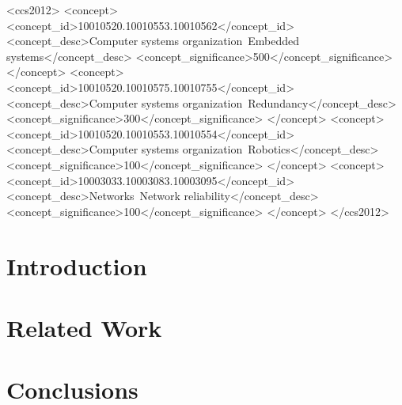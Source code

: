 \documentclass[sigconf]{acmart}
\begin{document}
%
%
\begin{CCSXML}
<ccs2012>
 <concept>
  <concept_id>10010520.10010553.10010562</concept_id>
  <concept_desc>Computer systems organization~Embedded systems</concept_desc>
  <concept_significance>500</concept_significance>
 </concept>
 <concept>
  <concept_id>10010520.10010575.10010755</concept_id>
  <concept_desc>Computer systems organization~Redundancy</concept_desc>
  <concept_significance>300</concept_significance>
 </concept>
 <concept>
  <concept_id>10010520.10010553.10010554</concept_id>
  <concept_desc>Computer systems organization~Robotics</concept_desc>
  <concept_significance>100</concept_significance>
 </concept>
 <concept>
  <concept_id>10003033.10003083.10003095</concept_id>
  <concept_desc>Networks~Network reliability</concept_desc>
  <concept_significance>100</concept_significance>
 </concept>
</ccs2012>  
\end{CCSXML}





\maketitle

\section{Introduction}


\vspace{-10pt}
\section{Related Work}






\section{Conclusions}



 
\end{document}
